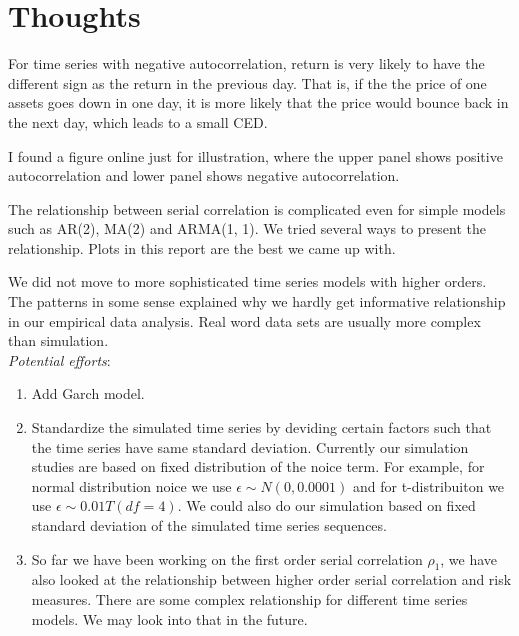 \documentclass[11pt]{article}
\begin{document}
\section{Thoughts} %

For time series with negative autocorrelation, return is very likely to have the different sign as the return in the previous day. That is, if the the price of one assets goes down in one day, it is more likely that the price would bounce back in the next day, which leads to a small CED.

I found a figure online just for illustration, where the upper panel shows positive autocorrelation and lower panel shows negative autocorrelation.




The relationship between serial correlation is complicated even for simple models such as AR(2), MA(2) and ARMA(1, 1). We tried several ways to present the relationship. Plots in this report are the best we came up with.

We did not move to more sophisticated time series models with higher orders. The patterns in some sense explained why we hardly get informative relationship in our empirical data analysis. Real word data sets are usually more complex than simulation.\\

\textit{Potential efforts}:
\begin{enumerate}
\item Add Garch model.
\item Standardize the simulated time series by deviding certain factors such that the time series have same standard deviation. Currently our simulation studies are based on fixed distribution of the noice term. For example, for normal distribution noice we use $\epsilon \sim N(0, 0.0001)$ and for t-distribuiton we use $\epsilon \sim 0.01T(df =4)$. We could also do our simulation based on fixed standard deviation of the simulated time series sequences.
\item So far we have been working on the first order serial correlation $\rho_1$, we have also looked at the relationship between higher order serial correlation and risk measures. There are some complex relationship for different time series models. We may look into that in the future. 
\end{enumerate}
\end{document}
